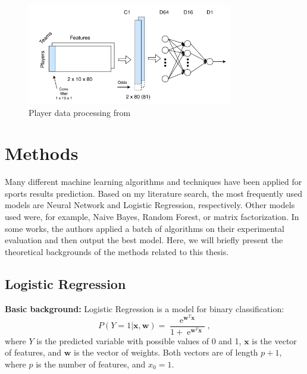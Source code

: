 \documentclass[thesis=M,english]{FITthesis}[2019/12/23]
\newcommand{\e}{\mathop{\mathrm{e}}}
\begin{document}
\begin{figure}[h]
    \centering
    \includegraphics[width=0.8\textwidth]{figures/conv.png}
    \caption{Player data processing from \cite{NBA_convolution}}
    \label{fig:conv}
\end{figure}

\section{Methods}
\label{methods}
Many different machine learning algorithms and techniques have been applied for sports results prediction. Based on my literature search, the most frequently used models are Neural Network and Logistic Regression, respectively. Other models used were, for example, Naive Bayes, Random Forest, or matrix factorization. In some works, the authors applied a batch of algorithms on their experimental evaluation and then output the best model. Here, we will briefly present the theoretical backgrounds of the methods related to this thesis.

\subsection{Logistic Regression}
\textbf{Basic background:} Logistic Regression is a model for binary classification: $$P(Y = 1|\boldsymbol{x},\boldsymbol{w}) = \frac{\e^{\boldsymbol{w}^T\boldsymbol{x}}}{1 + \e^{\boldsymbol{w}^T\boldsymbol{x}}},$$ where $Y$ is the predicted variable with possible values of 0 and 1, $\boldsymbol{x}$ is the vector of features, and $\boldsymbol{w}$ is the vector of weights. Both vectors are of length $p + 1$, where $p$ is the number of features, and $x_0 = 1$. 
\end{document}
